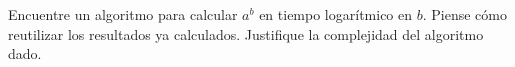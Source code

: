 
Encuentre un algoritmo para calcular $a^b$ en tiempo logarítmico en
$b$. Piense cómo reutilizar los resultados ya calculados. Justifique la
complejidad del algoritmo dado.
